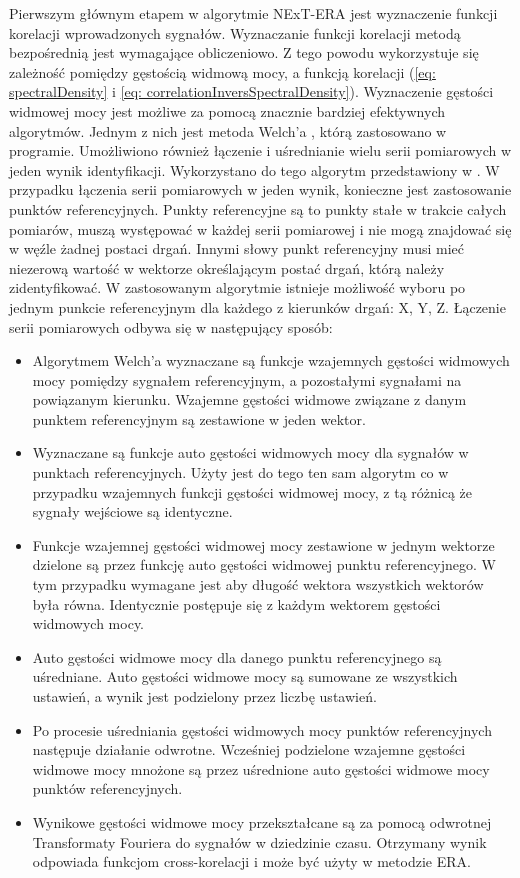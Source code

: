 Pierwszym głównym etapem w algorytmie NExT-ERA jest wyznaczenie funkcji korelacji wprowadzonych sygnałów. Wyznaczanie funkcji korelacji metodą bezpośrednią jest wymagające obliczeniowo. Z tego powodu wykorzystuje się zależność pomiędzy gęstością widmową mocy, a funkcją korelacji (\ref{eq: spectralDensity} i \ref{eq: correlationInversSpectralDensity}). Wyznaczenie gęstości widmowej mocy jest możliwe za pomocą znacznie bardziej efektywnych algorytmów. Jednym z nich jest metoda Welch'a \parencite{Welch1967,Brincker2015}, którą zastosowano w programie. Umożliwiono również łączenie i uśrednianie wielu serii pomiarowych w jeden wynik identyfikacji. Wykorzystano do tego algorytm przedstawiony w \cite{Brownjohn2010}. W przypadku łączenia serii pomiarowych w jeden wynik, konieczne jest zastosowanie punktów referencyjnych. Punkty referencyjne są to punkty stałe w trakcie całych pomiarów, muszą występować w każdej serii pomiarowej i nie mogą znajdować się w węźle żadnej postaci drgań. Innymi słowy punkt referencyjny musi mieć niezerową wartość w wektorze określającym postać drgań, którą należy zidentyfikować. W zastosowanym algorytmie istnieje możliwość wyboru po jednym punkcie referencyjnym dla każdego z kierunków drgań: X, Y, Z. Łączenie serii pomiarowych odbywa się w następujący sposób:
\begin{itemize}
	\item Algorytmem Welch'a wyznaczane są funkcje wzajemnych gęstości widmowych mocy pomiędzy sygnałem referencyjnym, a pozostałymi sygnałami na powiązanym kierunku.  Wzajemne gęstości widmowe związane z danym punktem referencyjnym są zestawione w jeden wektor.
	\item Wyznaczane są funkcje auto gęstości widmowych mocy dla sygnałów w punktach referencyjnych. Użyty jest do tego ten sam algorytm co w przypadku wzajemnych funkcji gęstości widmowej mocy, z tą różnicą że sygnały wejściowe są identyczne. 
	\item Funkcje wzajemnej gęstości widmowej mocy zestawione w jednym wektorze dzielone są przez funkcję auto gęstości widmowej punktu referencyjnego. W tym przypadku wymagane jest aby długość wektora wszystkich wektorów była równa. Identycznie postępuje się z każdym wektorem gęstości widmowych mocy.
	\item Auto gęstości widmowe mocy dla danego punktu referencyjnego są uśredniane. Auto gęstości widmowe mocy są sumowane ze wszystkich ustawień, a wynik jest podzielony przez liczbę ustawień.
	\item Po procesie uśredniania gęstości widmowych mocy punktów referencyjnych następuje działanie odwrotne. Wcześniej podzielone wzajemne gęstości widmowe mocy mnożone są przez uśrednione auto gęstości widmowe mocy punktów referencyjnych.
	\item Wynikowe gęstości widmowe mocy przekształcane są za pomocą odwrotnej Transformaty Fouriera do sygnałów w dziedzinie czasu. Otrzymany wynik odpowiada funkcjom cross-korelacji i może być użyty w metodzie ERA.
	
\end{itemize}


